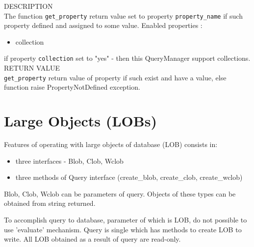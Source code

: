 \documentclass[10pt]{article}
\begin{document}
\noindent DESCRIPTION \\
The function \verb|get_property| return value set to property \verb|property_name| if such property defined and assigned to some value. 
Enabled properties : 
\begin{itemize}
 \item collection 
\end{itemize}
if property \verb|collection| set to "yes" - then this QueryManager support collections. \\
     
\noindent RETURN VALUE  \\
\verb|get_property|  return value of property if such exist and have a value, else function raise PropertyNotDefined exception. 


\section{ Large Objects (LOBs)  }

  Features of operating with large objects of database (LOB) consists in:
 \begin{itemize}
   \item three interfaces - Blob, Clob, Wclob
   \item three methods of Query interface (create\_blob, create\_clob, create\_wclob)
 \end{itemize}
  Blob, Clob, Wclob can be parameters of query. 
  Objects of these types can be obtained from string returned.

  To accomplish query to database, parameter of which is LOB, do not possible 
  to use 'evaluate' mechanism. Query is single which has methods to create LOB
  to write. All LOB obtained as a result of query are read-only.
\end{document}

